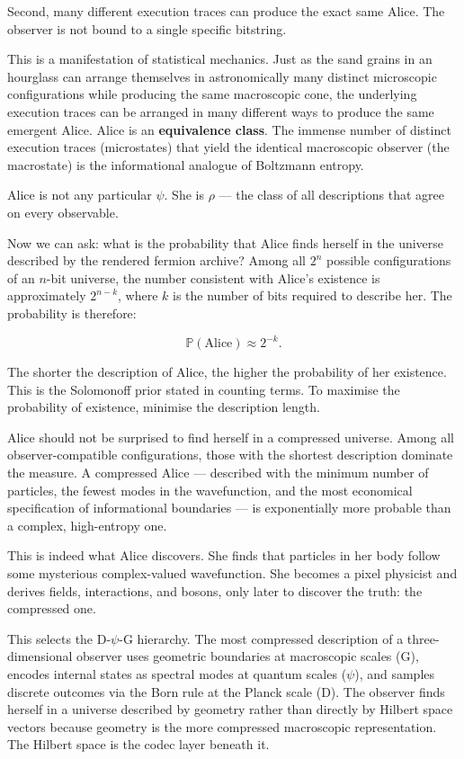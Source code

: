 Second, many different execution traces can produce the exact same
Alice. The observer is not bound to a single specific bitstring.

This is a manifestation of statistical mechanics. Just as the sand
grains in an hourglass can arrange themselves in astronomically many
distinct microscopic configurations while producing the same macroscopic
cone, the underlying execution traces can be arranged in many different
ways to produce the same emergent Alice. Alice is an \textbf{equivalence
class}. The immense number of distinct execution traces (microstates)
that yield the identical macroscopic observer (the macrostate) is the
informational analogue of Boltzmann entropy.

Alice is not any particular $\psi$. She is $\rho$ --- the class of all 
descriptions that agree on every observable.

Now we can ask: what is the probability that Alice finds herself in the
universe described by the rendered fermion archive? Among all $2^n$
possible configurations of an $n$-bit universe, the number consistent
with Alice's existence is approximately $2^{n-k}$, where $k$ is the
number of bits required to describe her. The probability is therefore:

\[
\mathbb{P}(\text{Alice}) \approx 2^{-k}.
\]

The shorter the description of Alice, the higher the probability of her
existence. This is the Solomonoff prior stated in counting terms. To
maximise the probability of existence, minimise the description length.

Alice should not be surprised to find herself in a compressed universe.
Among all observer-compatible configurations, those with the shortest
description dominate the measure. A compressed Alice --- described with
the minimum number of particles, the fewest modes in the wavefunction,
and the most economical specification of informational boundaries ---
is exponentially more probable than a complex, high-entropy one.

This is indeed what Alice discovers. She finds that particles in her body
follow some mysterious complex-valued wavefunction. She becomes a pixel
physicist and derives fields, interactions, and bosons, only later to 
discover the truth: the compressed one.

This selects the D-$\psi$-G hierarchy. The most compressed description
of a three-dimensional observer uses geometric boundaries at macroscopic
scales (G), encodes internal states as spectral modes at quantum scales
($\psi$), and samples discrete outcomes via the Born rule at the Planck
scale (D). The observer finds herself in a universe described by
geometry rather than directly by Hilbert space vectors because geometry
is the more compressed macroscopic representation. The Hilbert space is
the codec layer beneath it.

